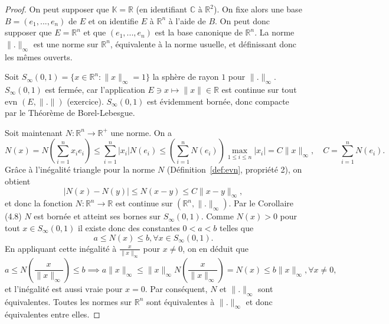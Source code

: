 \documentclass{article}
\begin{document}
\begin{proof}
On peut supposer que $\mathbb{K} = \mathbb{R}$ (en identifiant $\mathbb{C}$ à $\mathbb{R}^2$). On fixe alors une base $B = (e_1, ..., e_n)$ de $E$ et on identifie $E$ à $\mathbb{R}^n$ à l'aide de $B$. On peut donc supposer que $E = \mathbb{R}^n$ et que $(e_1, ..., e_n)$ est la base canonique de $\mathbb{R}^n$. La norme $\|.\|_\infty$ est une norme sur $\mathbb{R}^n$, équivalente à la norme usuelle, et définissant donc les mêmes ouverts.

Soit $S_\infty(0, 1) = \{x \in \mathbb{R}^n : \|x\|_\infty = 1\}$ la sphère de rayon $1$ pour $\|.\|_\infty$. $S_\infty(0, 1)$ est fermée, car l'application $E \ni x \mapsto \|x\| \in \mathbb{R}$ est continue sur tout evn $(E, \|.\|)$ (exercice). $S_\infty(0, 1)$ est évidemment bornée, donc compacte par le Théorème de Borel-Lebesgue.

Soit maintenant $N: \mathbb{R}^n \rightarrow \mathbb{R}^+$ une norme. On a
\begin{equation}
    N(x) = N \left( \sum_{i=1}^n x_i e_i \right) \leq \sum_{i=1}^n |x_i| N(e_i) \leq \left( \sum_{i=1}^n N(e_i) \right) \max_{1 \leq i \leq n} |x_i| = C \|x\|_\infty, \quad C = \sum_{i=1}^n N(e_i).
\end{equation}
Grâce à l'inégalité triangle pour la norme $N$ (Définition~\ref{def:evn}, propriété 2), on obtient
\begin{equation}
    |N(x) - N(y)| \leq N(x-y) \leq C \|x-y\|_\infty,
\end{equation}
et donc la fonction $N: \mathbb{R}^n \rightarrow \mathbb{R}$ est continue sur $(\mathbb{R}^n, \|.\|_\infty)$. Par le Corollaire (4.8) $N$ est bornée et atteint ses bornes sur $S_\infty(0, 1)$. Comme $N(x) > 0$ pour tout $x \in S_\infty(0, 1)$ il existe donc des constantes $0 < a < b$ telles que
\begin{equation}
    a \leq N(x) \leq b, \forall x \in S_\infty(0, 1).
\end{equation}
En appliquant cette inégalité à $\frac{x}{\|x\|_\infty}$ pour $x \neq 0$, on en déduit que
\begin{equation}
    a \leq N \left( \frac{x}{\|x\|_\infty} \right) \leq b \implies a \|x\|_\infty \leq \|x\|_\infty N \left( \frac{x}{\|x\|_\infty} \right) = N(x) \leq b \|x\|_\infty, \forall x \neq 0,
\end{equation}
et l'inégalité est aussi vraie pour $x=0$. Par conséquent, $N$ et $\|.\|_\infty$ sont équivalentes. Toutes les normes sur $\mathbb{R}^n$ sont équivalentes à $\|.\|_\infty$ et donc équivalentes entre elles.
\end{proof}
\end{document}
